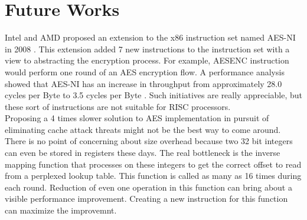 \section{Future Works}

Intel and AMD proposed an extension to the x86 instruction set named AES-NI in 2008 \citep{aesni}. This extension added 7 new instructions to the instruction set with a view to abstracting the encryption process. For example, AESENC instruction would perform one round of an AES encryption flow. A performance analysis showed that AES-NI has an increase in throughput from approximately 28.0 cycles per Byte to 3.5 cycles per Byte \citep{aesni}. Such initiatives are really appreciable, but these sort of instructions are not suitable for RISC processors.\\

Proposing a 4 times slower solution to AES implementation in pursuit of eliminating cache attack threats might not be the best way to come around. There is no point of concerning about size overhead because two 32 bit integers can even be stored in registers these days. The real bottleneck is the inverse mapping function that processes on these integers to get the correct offset to read from a perplexed lookup table. This function is called as many as 16 times during each round. Reduction of even one operation in this function can bring about a visible performance improvement. Creating a new instruction for this function can maximize the improvemnt.\\
